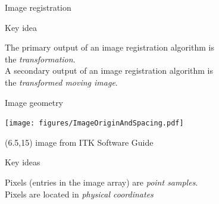 \documentclass[aspectratio=169]{beamer}
\newcommand\citefoot[1]{
    \begin{textblock}{12}(6.5,15)
        {\color{HHMIGrayB} \tiny #1}
    \end{textblock}
}
\begin{document}
\begin{frame}{Image registration}
{\begin{center}
        \end{center}
    }

\end{frame}

\begin{frame}{Key idea}

    The primary output of an image registration algorithm is \\
    the \emph{transformation}. \\ 
    \vspace{1em}
    A secondary output of an image registration algorithm is \\ 
    the \emph{transformed moving image}.

\end{frame}


\begin{frame}{Image geometry}
    \begin{center}
        \texttt{[image: figures/ImageOriginAndSpacing.pdf]}
    \end{center}
    \citefoot{image from ITK Software Guide}
\end{frame}


\begin{frame}{Key ideas}

    Pixels (entries in the image array) are \emph{point samples}. \\
    \vspace{1em}
    Pixels are located in \emph{physical coordinates}  

\end{frame}
\end{document}
